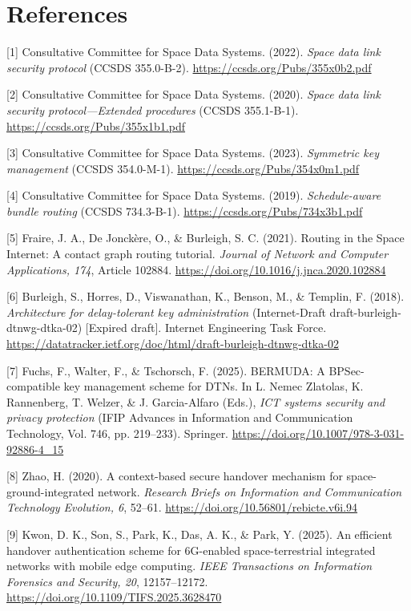 \documentclass[12pt,a4paper]{article}
\begin{document}
\section*{References}
\noindent\hangindent=0.7cm [1] Consultative Committee for Space Data Systems. (2022). \textit{Space data link security protocol} (CCSDS 355.0-B-2). \url{https://ccsds.org/Pubs/355x0b2.pdf}\par
\noindent\hangindent=0.7cm [2] Consultative Committee for Space Data Systems. (2020). \textit{Space data link security protocol---Extended procedures} (CCSDS 355.1-B-1). \url{https://ccsds.org/Pubs/355x1b1.pdf}\par
\noindent\hangindent=0.7cm [3] Consultative Committee for Space Data Systems. (2023). \textit{Symmetric key management} (CCSDS 354.0-M-1). \url{https://ccsds.org/Pubs/354x0m1.pdf}\par
\noindent\hangindent=0.7cm [4] Consultative Committee for Space Data Systems. (2019). \textit{Schedule-aware bundle routing} (CCSDS 734.3-B-1). \url{https://ccsds.org/Pubs/734x3b1.pdf}\par
\noindent\hangindent=0.7cm [5] Fraire, J. A., De Jonckère, O., \& Burleigh, S. C. (2021). Routing in the Space Internet: A contact graph routing tutorial. \textit{Journal of Network and Computer Applications, 174}, Article 102884. \url{https://doi.org/10.1016/j.jnca.2020.102884}\par
\noindent\hangindent=0.7cm [6] Burleigh, S., Horres, D., Viswanathan, K., Benson, M., \& Templin, F. (2018). \textit{Architecture for delay-tolerant key administration} (Internet-Draft draft-burleigh-dtnwg-dtka-02) [Expired draft]. Internet Engineering Task Force. \url{https://datatracker.ietf.org/doc/html/draft-burleigh-dtnwg-dtka-02}\par
\noindent\hangindent=0.7cm [7] Fuchs, F., Walter, F., \& Tschorsch, F. (2025). BERMUDA: A BPSec-compatible key management scheme for DTNs. In L. Nemec Zlatolas, K. Rannenberg, T. Welzer, \& J. Garcia-Alfaro (Eds.), \textit{ICT systems security and privacy protection} (IFIP Advances in Information and Communication Technology, Vol. 746, pp. 219--233). Springer. \url{https://doi.org/10.1007/978-3-031-92886-4_15}\par
\noindent\hangindent=0.7cm [8] Zhao, H. (2020). A context-based secure handover mechanism for space-ground-integrated network. \textit{Research Briefs on Information and Communication Technology Evolution, 6}, 52--61. \url{https://doi.org/10.56801/rebicte.v6i.94}\par
\noindent\hangindent=0.7cm [9] Kwon, D. K., Son, S., Park, K., Das, A. K., \& Park, Y. (2025). An efficient handover authentication scheme for 6G-enabled space-terrestrial integrated networks with mobile edge computing. \textit{IEEE Transactions on Information Forensics and Security, 20}, 12157--12172. \url{https://doi.org/10.1109/TIFS.2025.3628470}\par
\end{document}
